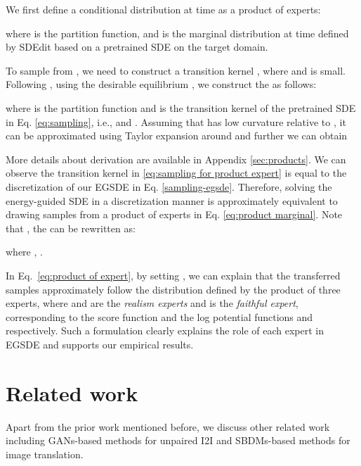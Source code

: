 \documentclass{article}
\begin{document}
We first define a conditional distribution  at time  as a product of experts:
 
where  is the partition function,  and  is the marginal distribution at time  defined by SDEdit based on a pretrained SDE on the target domain.  

To sample from , we need to construct a transition kernel , where  and  is small. Following \cite{sohl2015deep}, using the desirable equilibrium , we construct the  as follows:

where  is the partition function and  is the transition kernel of the pretrained SDE in Eq. \eqref{eq:sampling}, i.e.,  and .
Assuming that  has low curvature relative to , it can be approximated using Taylor expansion around  and further we can obtain

More details about derivation are available in Appendix \ref{sec:products}. We can observe the transition kernel  in \eqref{eq:sampling for product expert} is equal to the discretization of our EGSDE in Eq. \eqref{sampling-egsde}. Therefore, solving the energy-guided SDE in a discretization manner is approximately equivalent to drawing samples from a product of experts in Eq. \eqref{eq:product marginal}. Note that , the  can be rewritten as:

where , .

In Eq.~\eqref{eq:product of expert}, by setting , we can explain that the transferred samples approximately follow the distribution defined by the product of three experts, where  and  are the \emph{realism experts} and  is the \emph{faithful expert}, corresponding to the score function  and the log potential functions  and  respectively.
Such a formulation clearly explains the role of each expert in EGSDE and supports our empirical results.


















\section{Related work}




Apart from the prior work mentioned before, we discuss other related work including GANs-based methods for unpaired I2I and SBDMs-based methods for image translation.
\end{document}

